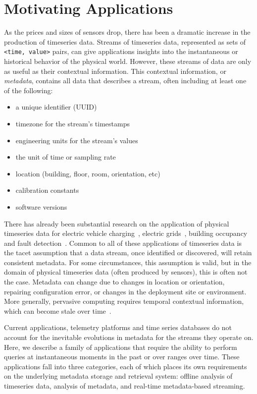 \section{Motivating Applications} \label{section:motivation}

As the prices and sizes of sensors drop, there has been a dramatic increase in
the production of timeseries data. Streams of timeseries data, represented as
sets of \texttt{<time, value>} pairs, can give applications insights into the
instantaneous or historical behavior of the physical world.  However, these
streams of data are only as useful as their contextual information.  This
contextual information, or \emph{metadata}, contains all data that describes a
stream, often including at least one of the following:

\begin{itemize}
\item a unique identifier (UUID)
\item timezone for the stream's timestamps
\item engineering units for the stream's values
\item the unit of time or sampling rate
\item location (building, floor, room, orientation, etc)
\item calibration constants
\item software versions
\end{itemize}

There has already been substantial research on the application of physical
timeseries data for electric vehicle charging~\cite{sortomme2011optimal},
electric grids~\cite{carreras2004evidence}, building
occupancy~\cite{richardson2008high} and fault
detection~\cite{fontugne2013strip}. Common to all of these applications of
timeseries data is the tacet assumption that a data stream, once identified or
discovered, will retain consistent metadata. For some circumstances, this
assumption is valid, but in the domain of physical timeseries data (often
produced by sensors), this is often not the case. Metadata can change due to
changes in location or orientation, repairing configuration error, or changes
in the deployment site or environment. More generally, pervasive computing
requires temporal contextual information, which can become stale over
time~\cite{henricksen2002modeling}.

Current applications, telemetry platforms and time series databases do not
account for the inevitable evolutions in metadata for the streams they operate
on. Here, we describe a family of applications that require the ability to
perform queries at instantaneous moments in the past or over ranges over time.
These applications fall into three categories, each of which places its
own requirements on the underlying metadata storage and retrieval system:
offline analysis of timeseries data, analysis of metadata, and real-time
metadata-based streaming.

